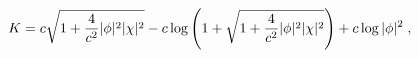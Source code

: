 \begin{equation}
 K = c \sqrt{1 + {4 \over c^2} |\phi|^2 |\chi|^2 } 
   - c \log \left(1 + \sqrt{1 
       + {4 \over c^2} |\phi|^2 |\chi|^2 } \right)
   + c \log |\phi|^2 \;, \label{kahler}
\end{equation}

